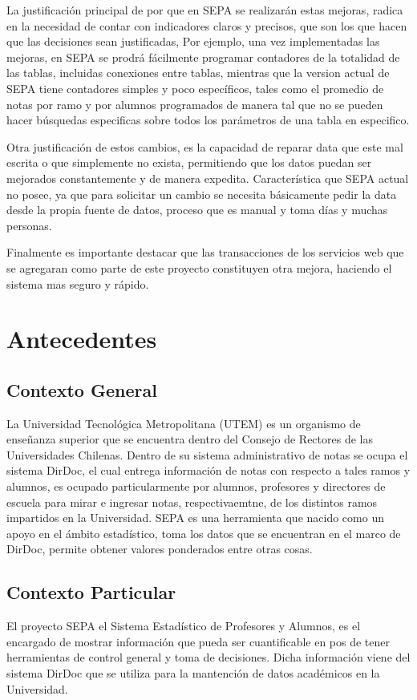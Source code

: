 \documentclass[a4paper,12pt,openany,oneside]{book}
\begin{document}
La justificación principal de por que en SEPA se realizarán estas mejoras, radica en la necesidad de contar con indicadores claros y precisos, que son los que hacen que las decisiones sean justificadas, Por ejemplo, una vez implementadas las mejoras, en SEPA se prodrá fácilmente programar contadores de la totalidad de las tablas, incluidas conexiones entre tablas, mientras que la version actual de SEPA tiene contadores simples y poco específicos, tales como el promedio de notas por ramo y por alumnos programados de manera tal que no se pueden hacer búsquedas especificas sobre todos los parámetros de una tabla en especifico.

Otra justificación de estos cambios, es la capacidad de reparar data que este mal escrita o que simplemente no exista, permitiendo que los datos puedan ser mejorados constantemente y de manera expedita. Característica que SEPA actual no posee, ya que para solicitar un cambio se necesita básicamente pedir la data desde la propia fuente de datos, proceso que es manual y toma días y muchas personas.

Finalmente es importante destacar que las transacciones de los servicios web que se agregaran como parte de este proyecto constituyen otra mejora, haciendo el sistema mas seguro y rápido.

\chapter{Antecedentes}
\thispagestyle{empty}
\section{Contexto General}
La Universidad Tecnológica Metropolitana (UTEM) es un organismo de enseñanza superior que se encuentra dentro del Consejo de Rectores de las Universidades Chilenas. Dentro de su sistema administrativo de notas se ocupa el sistema DirDoc, el cual entrega información de notas con respecto a tales ramos y alumnos, es ocupado particularmente por alumnos, profesores y directores de escuela para  mirar e ingresar notas, respectivaemtne, de los distintos ramos impartidos en la Universidad. SEPA es una herramienta que nacido como un apoyo en el ámbito estadístico, toma los datos que se encuentran en el marco de DirDoc, permite obtener valores ponderados entre otras cosas.
\section{Contexto Particular}
El proyecto SEPA el Sistema Estadístico de Profesores y Alumnos, es el encargado de mostrar información que pueda ser cuantificable en pos de tener herramientas de control general y toma de decisiones. Dicha información viene del sistema DirDoc que se utiliza para la mantención de datos académicos en la Universidad.
\end{document}
